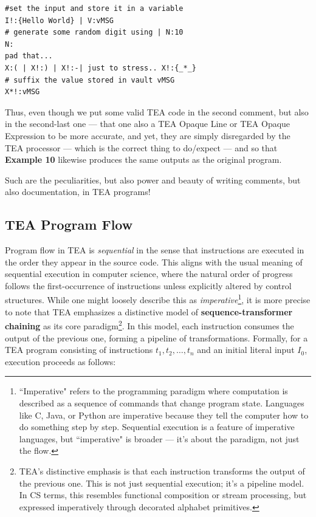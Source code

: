 \documentclass[a4paper, 18pt]{book} %
\begin{document}
{{{\begin{appendices}
\vspace{2em}

  \begin{tcolorbox}[teaterminalstyle, title=TEA COMMENTS: Example 10: Program with comments and TOL, breakable]
  \begin{lstlisting}[language=TEA,breaklines=true,]
#set the input and store it in a variable
I!:{Hello World} | V:vMSG
# generate some random digit using | N:10
N:
pad that... 
X:( | X!:) | X!:-| just to stress.. X!:{_*_}
# suffix the value stored in vault vMSG
X*!:vMSG
   \end{lstlisting}
  \end{tcolorbox}

\vspace{2em}

Thus, even though we put some valid TEA code in the second comment, but also in the second-last one --- that one also a TEA Opaque Line or TEA Opaque Expression to be more accurate, and yet, they are simply disregarded by the TEA processor --- which is the correct thing to do/expect --- and so that \textbf{Example 10} likewise produces the same outputs as the original program.


\vspace{2em}

Such are the peculiarities, but also power and beauty of writing comments, but also documentation, in TEA programs!



\subsection{TEA Program Flow}

Program flow in TEA is \emph{sequential} in the sense that instructions are executed in the order they appear in the source code. This aligns with the usual meaning of sequential execution in computer science, where the natural order of progress follows the first-occurrence of instructions unless explicitly altered by control structures. While one might loosely describe this as \emph{imperative}\footnote{``Imperative" refers to the programming paradigm where computation is described as a sequence of commands that change program state. Languages like C, Java, or Python are imperative because they tell the computer how to do something step by step. Sequential execution is a feature of imperative languages, but ``imperative" is broader — it's about the paradigm, not just the flow.}, it is more precise to note that TEA emphasizes a distinctive model of \textbf{sequence-transformer chaining} as its core paradigm\footnote{TEA's distinctive emphasis is that each instruction transforms the output of the previous one. This is not just sequential execution; it's a pipeline model. In CS terms, this resembles functional composition or stream processing, but expressed imperatively through decorated alphabet primitives.}. In this model, each instruction consumes the output of the previous one, forming a pipeline of transformations. Formally, for a TEA program consisting of instructions $t_1, t_2, \ldots, t_n$ and an initial literal input $I_0$, execution proceeds as follows:



\end{appendices}}}}
\end{document}
